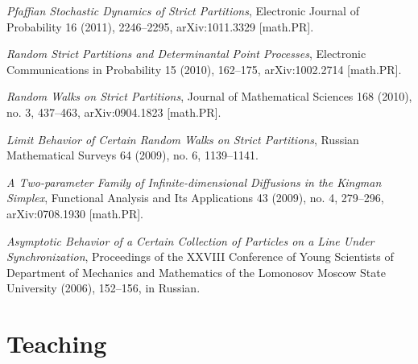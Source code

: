 \documentclass[letterpaper,11pt]{article}
\begin{document}
\begin{etaremune}
    \item  \emph{Pfaffian Stochastic Dynamics of Strict Partitions},  Electronic Journal of Probability 16 (2011), 2246--2295, arXiv:1011.3329 [math.PR].
    \item \emph{Random Strict Partitions and Determinantal Point Processes}, Electronic Communications in Probability 15 (2010), 162--175, arXiv:1002.2714 [math.PR].
    \item  \emph{Random Walks on Strict Partitions}, Journal of Mathematical Sciences 168 (2010), no. 3, 437--463, arXiv:0904.1823 [math.PR].  
    \item  \emph{Limit Behavior of Certain Random Walks on Strict Partitions}, Russian Mathematical Surveys 64 (2009), no. 6, 1139--1141.
    \item  \emph{A Two-parameter Family of Infinite-dimensional Diffusions in the Kingman Simplex}, Functional Analysis and Its Applications 43 (2009), no. 4, 279--296, arXiv:0708.1930 [math.PR].
     \item 
    \emph{Asymptotic Behavior of a Certain Collection of Particles on a Line Under Synchronization}, Proceedings of the XXVIII Conference of Young Scientists of Department of Mechanics and Mathematics of the Lomonosov Moscow State University (2006), 152--156, in Russian.
\end{etaremune}



\section*{Teaching}
\end{document}
